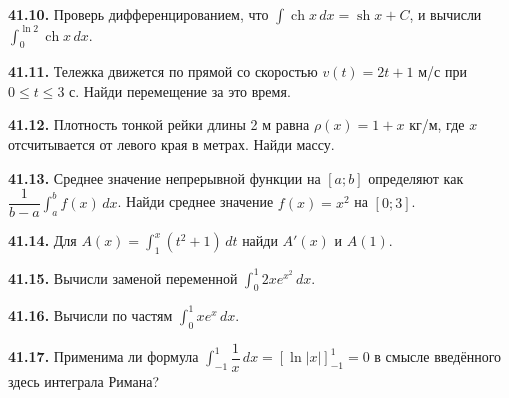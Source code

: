 \noindent\begin{minipage}[t]{\linewidth}\textbf{41.10.} Проверь дифференцированием, что \(\int\operatorname{ch}x\,dx=\operatorname{sh}x+C\), и вычисли \(\int_0^{\ln2}\operatorname{ch}x\,dx\).\par\end{minipage}\par
\noindent\begin{minipage}[t]{\linewidth}\textbf{41.11.} Тележка движется по прямой со скоростью \(v(t)=2t+1\) м/с при \(0\le t\le3\) с. Найди перемещение за это время.\par\end{minipage}\par
\noindent\begin{minipage}[t]{\linewidth}\textbf{41.12.} Плотность тонкой рейки длины 2 м равна \(\rho(x)=1+x\) кг/м, где \(x\) отсчитывается от левого края в метрах. Найди массу.\par\end{minipage}\par
\noindent\begin{minipage}[t]{\linewidth}\textbf{41.13.} Среднее значение непрерывной функции на \([a;b]\) определяют как \(\dfrac1{b-a}\int_a^b f(x)\,dx\). Найди среднее значение \(f(x)=x^2\) на \([0;3]\).\par\end{minipage}\par
\noindent\begin{minipage}[t]{\linewidth}\textbf{41.14.} Для \(A(x)=\int_1^x(t^2+1)\,dt\) найди \(A'(x)\) и \(A(1)\).\par\end{minipage}\par
\noindent\begin{minipage}[t]{\linewidth}\textbf{41.15.} Вычисли заменой переменной \(\int_0^1 2x e^{x^2}\,dx\).\par\end{minipage}\par
\noindent\begin{minipage}[t]{\linewidth}\textbf{41.16.} Вычисли по частям \(\int_0^1 xe^x\,dx\).\par\end{minipage}\par
\noindent\begin{minipage}[t]{\linewidth}\textbf{41.17.} Применима ли формула \(\int_{-1}^1\dfrac1x\,dx=[\ln|x|]_{-1}^1=0\) в смысле введённого здесь интеграла Римана?\par\end{minipage}\par
